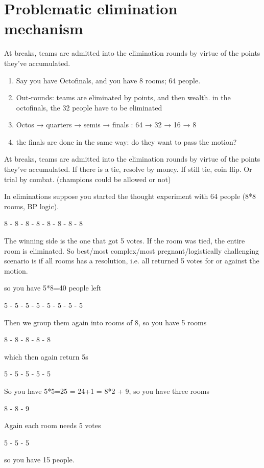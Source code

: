 



\section{Problematic elimination mechanism}

At breaks, teams are admitted into the elimination rounds by virtue of the points they've accumulated.

\begin{enumerate}
    \item Say you have Octofinals, and you have 8 rooms; 64 people.
    \item Out-rounds: teams are eliminated by points, and then wealth. in the octofinals, the 32 people have to be eliminated
    \item Octos → quarters → semis → finals : 64 → 32 → 16 → 8
    \item the finals are done in the same way: do they want to pass the motion?
\end{enumerate}

At breaks, teams are admitted into the elimination rounds by virtue of the points they've accumulated. If there is a tie, resolve by money. If still tie, coin flip. Or trial by combat. (champions could be allowed or not)

In eliminations suppose you started the thought experiment with 64 people (8*8 rooms, BP logic).

8 - 8 - 8 - 8 - 8 - 8 - 8 - 8

The winning side is the one that got 5 votes. If the room was tied, the entire room is eliminated. So best/most complex/most pregnant/logistically challenging scenario is if all rooms has a resolution, i.e. all returned 5 votes for or against the motion.

so you have 5*8=40 people left

5 - 5 - 5 - 5 - 5 - 5 - 5 - 5

Then we group them again into rooms of 8, so you have 5 rooms

8 - 8 - 8 - 8 - 8

which then again return 5s

5 - 5 - 5 - 5 - 5

So you have 5*5=25 = 24+1 = 8*2 + 9, so you have three rooms

8 - 8 - 9

Again each room needs 5 votes

5 - 5 - 5

so you have 15 people.

